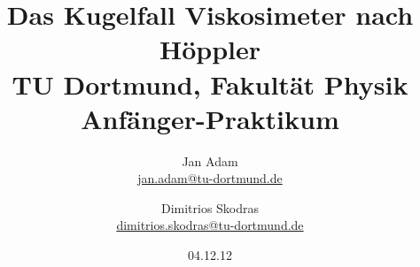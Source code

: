 

\usepackage{float}
\usepackage{caption}
\usepackage{wrapfig}
\usepackage{setspace}
\usepackage{threeparttable}
\usepackage{footnote}



\title{Das Kugelfall Viskosimeter nach Höppler\\				%
\large TU Dortmund, Fakultät Physik\\ 
\normalsize Anfänger-Praktikum}

\author{Jan Adam\\			%
{\small \href{jan.adam@tu-dortmund.de}{jan.adam@tu-dortmund.de}}	%
\and						%
Dimitrios Skodras\\			%
{\small \href{dimitrios.skodras@tu-dortmund.de}{dimitrios.skodras@tu-dortmund.de}}		%
}
\date{04.12.12}					%





\maketitle					%
\thispagestyle{empty} 				%



\tableofcontents


